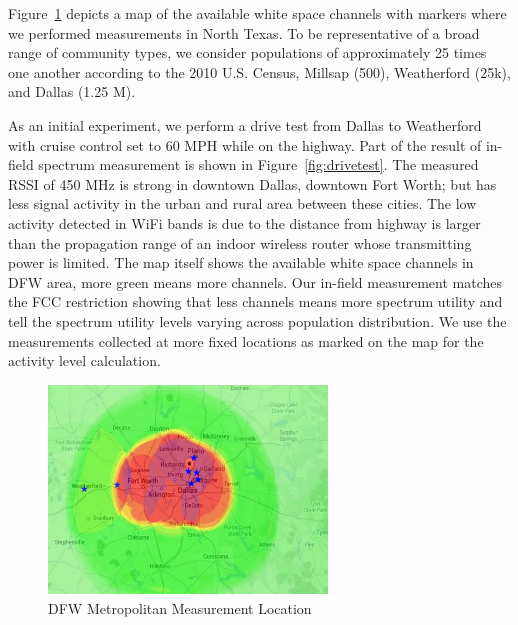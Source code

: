 Figure~\ref{fig:drivemap} depicts a map of the available white space channels with
markers where we performed measurements in North Texas. To be representative of a broad range of 
community types, we consider populations of approximately 25 times one another according to the
2010 U.S. Census, Millsap (500), Weatherford (25k), and Dallas (1.25 M). 

As an initial experiment, 
we perform a drive test from Dallas to Weatherford with cruise control set to 60 MPH while on
the highway.  
Part of the result of in-field spectrum measurement is shown in Figure~\ref{fig:drivetest}.
The measured RSSI of 450 MHz is strong in downtown Dallas, downtown Fort Worth;
but has less signal activity in the urban and rural area between these cities.
The low activity detected in WiFi bands is due to the distance from highway is larger
than the propagation range of an indoor wireless router whose transmitting power is limited.
The map itself shows the available white space channels in DFW area, more green means
more channels. Our in-field measurement matches the FCC restriction showing that less channels means
more spectrum utility and tell the spectrum utility levels varying across population 
distribution. We use the measurements collected at more fixed locations as marked on the map for
 the activity level calculation. 

\begin{figure}
\centering
\includegraphics[width=74mm]{figures/drivemap}
\vspace{-0.1in}
\caption{DFW Metropolitan Measurement Location}                                                                 
\label{fig:drivemap}
\vspace{-0.1in}
\end{figure}
   
